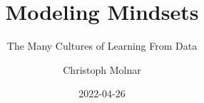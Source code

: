 \documentclass[
  10pt,
]{scrbook}
\title{Modeling Mindsets}
\subtitle{The Many Cultures of Learning From Data}
\author{Christoph Molnar}
\date{2022-04-26}
\begin{document}
\maketitle

\thispagestyle{empty}

\end{document}
